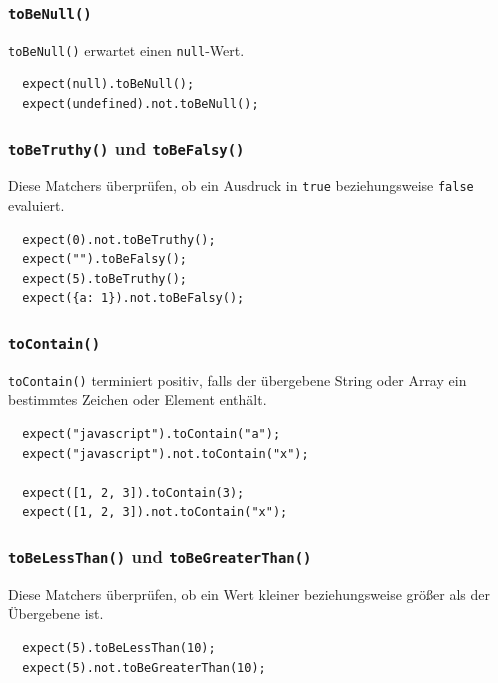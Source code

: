 \documentclass[11pt, a4paper]{article}
\begin{document}
\subsubsection*{\texttt{toBeNull()}}

\texttt{toBeNull()} erwartet einen \texttt{null}-Wert.

\begin{verbatim}
  expect(null).toBeNull();
  expect(undefined).not.toBeNull();
\end{verbatim}

\subsubsection*{\texttt{toBeTruthy()} und \texttt{toBeFalsy()}}

Diese Matchers überprüfen, ob ein Ausdruck in \texttt{true} beziehungsweise
\texttt{false} evaluiert.

\begin{verbatim}
  expect(0).not.toBeTruthy();
  expect("").toBeFalsy();
  expect(5).toBeTruthy();
  expect({a: 1}).not.toBeFalsy();
\end{verbatim}

\subsubsection*{\texttt{toContain()}}

\texttt{toContain()} terminiert positiv, falls der übergebene String oder Array
ein bestimmtes Zeichen oder Element enthält.

\begin{verbatim}
  expect("javascript").toContain("a");
  expect("javascript").not.toContain("x");

  expect([1, 2, 3]).toContain(3);
  expect([1, 2, 3]).not.toContain("x");
\end{verbatim}

\subsubsection*{\texttt{toBeLessThan()} und \texttt{toBeGreaterThan()}}

Diese Matchers überprüfen, ob ein Wert kleiner beziehungsweise größer als der
Übergebene ist.

\begin{verbatim}
  expect(5).toBeLessThan(10);
  expect(5).not.toBeGreaterThan(10);
\end{verbatim}
\end{document}
